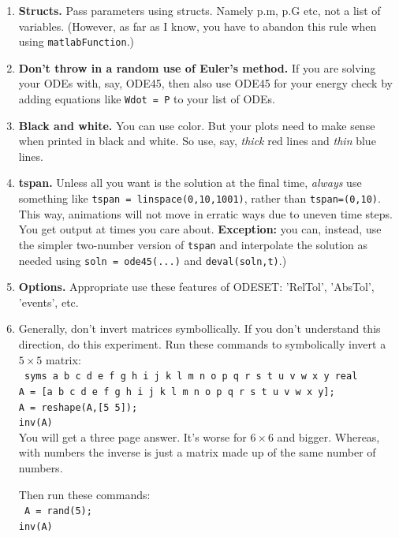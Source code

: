 \documentclass[11pt]{article}
\begin{document}
\begin{enumerate}
\begin{enumerate}
\begin{enumerate}
\begin{enumerate}
\item  \textbf{Structs. } Pass parameters using structs.  Namely p.m, p.G etc, not a list of variables.  (However, as far as I know, you have to abandon this rule when using {\tt matlabFunction}.)

\item  \textbf{Don't throw in a random use of Euler's method. } If you are solving your ODEs with, say, ODE45,  then also use ODE45 for your energy check by adding equations like  {\tt Wdot = P} to your list of ODEs.

\item  \textbf{Black and white.}  You can use color.  But your plots need to make sense when printed in black and white.  So use, say, \textit{thick} red lines and \textit{thin} blue lines.

\item  \textbf{tspan.}   Unless all you want is the solution at the final time, \textit{always} use something like
{\tt tspan = linspace(0,10,1001)},  rather than   {\tt  tspan=(0,10)}.  This way, animations will not move in erratic ways due to uneven time steps.   You get output at times you care about. \textbf{Exception:}  you can, instead,  use the simpler two-number version of {\tt tspan} and interpolate the solution as needed using {\tt soln = ode45(...)}  and {\tt deval(soln,t)}.)

\item  \textbf{Options.}  Appropriate  use these features of ODESET:   'RelTol', 'AbsTol', 'events', etc.

\item Generally, don't invert matrices symbollically. If you don't understand this direction, do this 
experiment.  Run these \matlab commands to symbolically invert a $5\times5$ matrix:\\
{\tt
syms a b c d e f g h i j k l m n o p q r s t u v w x y real  \\
A = [a b c d e f g h i j k l m n o p q r s t u v w x y];\\
A = reshape(A,[5 5]);\\
inv(A)
}
\\

You will get a three page answer.  It's worse for $6\times6$ and bigger.   Whereas, with numbers the inverse  is just a matrix made up of the same number of numbers. 

Then run these \matlab commands:\\
{\tt
A = rand(5);\\
inv(A)
}



\end{enumerate}


\end{enumerate}
\end{enumerate} 
\end{enumerate}

\clearpage
\end{document}
